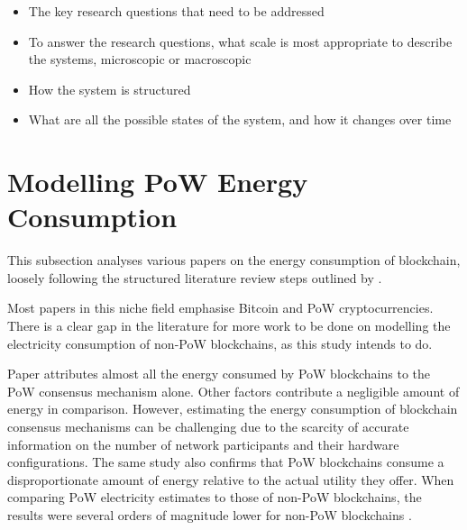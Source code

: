 \begin{itemize}
    \item The key research questions that need to be addressed
    \item To answer the research questions, what scale is most appropriate to describe the systems, microscopic or macroscopic
    \item How the system is structured
    \item What are all the possible states of the system, and how it changes over time
\end{itemize}








\section{Modelling PoW Energy Consumption}

This subsection analyses various papers on the energy consumption of blockchain, loosely following the structured literature review steps outlined by \cite{Crosby2015BlockChainBitcoin}.

Most papers in this niche field emphasise Bitcoin and PoW cryptocurrencies. There is a clear gap in the literature for more work to be done on modelling the electricity consumption of non-PoW blockchains, as this study intends to do.

Paper \cite{Sedlmeir2020TheMyth} attributes almost all the energy consumed by PoW blockchains to the PoW consensus mechanism alone. Other factors contribute a negligible amount of energy in comparison. However, estimating the energy consumption of blockchain consensus mechanisms can be challenging due to the scarcity of accurate information on the number of network participants and their hardware configurations. The same study also confirms that PoW blockchains consume a disproportionate amount of energy relative to the actual utility they offer. When comparing PoW electricity estimates to those of non-PoW blockchains, the results were several orders of magnitude lower for non-PoW blockchains \cite{Sedlmeir2020TheMyth}. 

